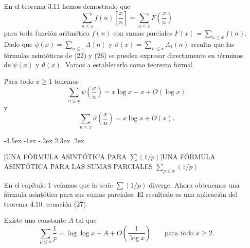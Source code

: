 \documentclass[12pt,a4paper]{book}
\makeatletter
\renewcommand\section{\@startsection{section}{1}{\z@}%
  {-3.5ex \@plus -1ex \@minus -.2ex}%
  {2.3ex \@plus .2ex}%
  {\normalfont\Large\bfseries\raggedright}}
\makeatother
\begin{document}
    En el teorema 3.11 hemos demostrado que
    \begin{equation*}
        \sum_{n\leq x}f(n)\left[\frac{x}{n}\right]=\sum_{n\leq x}F\left(\frac{x}{n}\right)
    \end{equation*}
    para toda función aritmética $f(n)$ con sumas parciales $F(x)=\sum_{n\leq x}f(n)$.
    Dado que $\psi(x)=\sum_{n\leq x}\Lambda(n)$ y $\vartheta(x)=\sum_{n\leq x}\Lambda_{1}(n)$
    resulta que las fórmulas asintóticas de (22) y (26) se pueden expresar directamente
    en términos de $\psi(x)$ y $\vartheta(x)$. Vamos a establecerlo como teorema formal.

    \begin{teorema}
        Para todo $x\geq1$ tenemos
        \begin{equation}
            \sum_{n\leq x}\psi\left(\frac{x}{n}\right)=x\log x-x+O(\log x)
        \end{equation}
        y
        \begin{equation*}
            \sum_{n\leq x}\vartheta\left(\frac{x}{n}\right)=x\log x+O(x).
        \end{equation*}
    \end{teorema}

    \section[UNA FÓRMULA ASINTÓTICA PARA \texorpdfstring{$\sum(1/p)$}{∑(1/p)}]{UNA FÓRMULA ASINTÓTICA PARA LAS SUMAS PARCIALES \texorpdfstring{$\sum_{p\leq x}(1/p)$}{∑p≤ x(1/p)}}

    En el capítulo 1 veíamos que la serie $\sum(1/p)$ diverge. Ahora obtenemos una
    fórmula asintótica para sus sumas parciales. El resultado es una aplicación del
    teorema 4.10, ecuación (27).

    \begin{teorema}
        Existe una constante $A$ tal que
        \begin{equation}
            \sum_{p\leq x}\frac{1}{p}=\log\log x+A+O\left(\frac{1}{\log x}\right)\qquad
            \text{para todo } x\geq2.
        \end{equation}
    \end{teorema}
\end{document}
